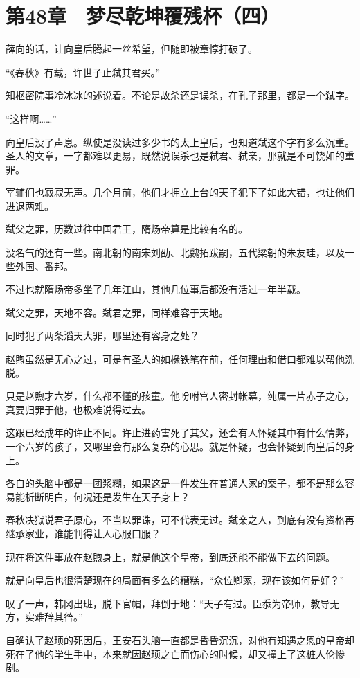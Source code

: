 \section{第48章　梦尽乾坤覆残杯（四）}

薛向的话，让向皇后腾起一丝希望，但随即被章惇打破了。

“《春秋》有载，许世子止弑其君买。”

知枢密院事冷冰冰的述说着。不论是故杀还是误杀，在孔子那里，都是一个弑字。

“这样啊……”

向皇后没了声息。纵使是没读过多少书的太上皇后，也知道弑这个字有多么沉重。圣人的文章，一字都难以更易，既然说误杀也是弑君、弑亲，那就是不可饶如的重罪。

宰辅们也寂寂无声。几个月前，他们才拥立上台的天子犯下了如此大错，也让他们进退两难。

弑父之罪，历数过往中国君王，隋炀帝算是比较有名的。

没名气的还有一些。南北朝的南宋刘劭、北魏拓跋嗣，五代梁朝的朱友珪，以及一些外国、番邦。

不过也就隋炀帝多坐了几年江山，其他几位事后都没有活过一年半载。

弑父之罪，天地不容。弑君之罪，同样难容于天地。

同时犯了两条滔天大罪，哪里还有容身之处？

赵煦虽然是无心之过，可是有圣人的如椽铁笔在前，任何理由和借口都难以帮他洗脱。

只是赵煦才六岁，什么都不懂的孩童。他吩咐宫人密封帐幕，纯属一片赤子之心，真要归罪于他，也极难说得过去。

这跟已经成年的许止不同。许止进药害死了其父，还会有人怀疑其中有什么情弊，一个六岁的孩子，又哪里会有那么复杂的心思。就是怀疑，也会怀疑到向皇后的身上。

各自的头脑中都是一团浆糊，如果这是一件发生在普通人家的案子，都不是那么容易能析断明白，何况还是发生在天子身上？

春秋决狱说君子原心，不当以罪诛，可不代表无过。弑亲之人，到底有没有资格再继承家业，谁能判得让人心服口服？

现在将这件事放在赵煦身上，就是他这个皇帝，到底还能不能做下去的问题。

就是向皇后也很清楚现在的局面有多么的糟糕，“众位卿家，现在该如何是好？”

叹了一声，韩冈出班，脱下官帽，拜倒于地：“天子有过。臣忝为帝师，教导无方，实难辞其咎。”

自确认了赵顼的死因后，王安石头脑一直都是昏昏沉沉，对他有知遇之恩的皇帝却死在了他的学生手中，本来就因赵顼之亡而伤心的时候，却又撞上了这桩人伦惨剧。

